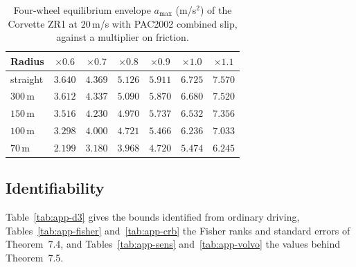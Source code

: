 \documentclass[12pt, twoside]{amsart}
\theoremstyle{definition}
\newcommand{\amax}{a_{\max}}
\newcommand{\mainref}[2]{#2}
\begin{document}
\begin{table}[htbp]
\centering\small
\caption{Four-wheel equilibrium envelope $\amax$ (m/s$^2$) of the Corvette ZR1 at $20$\,m/s with PAC2002 combined slip, against a multiplier on friction.}\label{tab:app-fourwheel}
\begin{tabular}{lcccccc}
\toprule
Radius & $\times0.6$ & $\times0.7$ & $\times0.8$ & $\times0.9$ & $\times1.0$ & $\times1.1$\\
\midrule
straight & $3.640$ & $4.369$ & $5.126$ & $5.911$ & $6.725$ & $7.570$\\
$300$\,m & $3.612$ & $4.337$ & $5.090$ & $5.870$ & $6.680$ & $7.520$\\
$150$\,m & $3.516$ & $4.230$ & $4.970$ & $5.737$ & $6.532$ & $7.356$\\
$100$\,m & $3.298$ & $4.000$ & $4.721$ & $5.466$ & $6.236$ & $7.033$\\
$70$\,m & $2.199$ & $3.180$ & $3.968$ & $4.720$ & $5.474$ & $6.245$\\
\bottomrule
\end{tabular}
\end{table}
\FloatBarrier

\subsection{Identifiability}

Table~\ref{tab:app-d3} gives the bounds identified from ordinary driving, Tables~\ref{tab:app-fisher}
and~\ref{tab:app-crb} the Fisher ranks and standard errors of Theorem~\mainref{thm:jointid}{7.4}, and
Tables~\ref{tab:app-sens} and~\ref{tab:app-volvo} the values behind Theorem~\mainref{thm:info}{7.5}.
\end{document}
